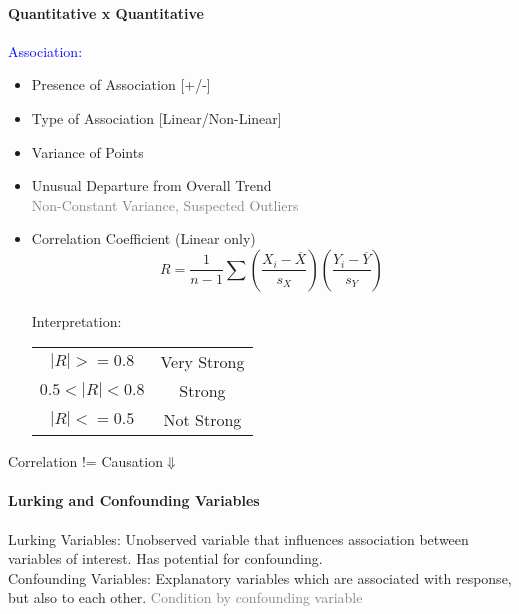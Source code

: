 \paragraph{Quantitative x Quantitative}
\textcolor{Blue}{Association:}
\begin{itemize}
	\item Presence of Association [+/-]
	\item Type of Association [Linear/Non-Linear]
	\item Variance of Points
	\item Unusual Departure from Overall Trend\\
		\textcolor{Gray}{Non-Constant Variance, Suspected Outliers}
	\item Correlation Coefficient (Linear only)
		\[R=\frac{1}{n-1}\sum(\frac{X_i-\overline{X}}{s_X})(\frac{Y_i-\overline{Y}}{s_Y})\]\\
		Interpretation:\\
		\begin{center}
			\begin{tabular}{c c}
				\midrule
				$\left|R\right|>=0.8$ & Very Strong\\
				$0.5<\left|R\right|<0.8$ & Strong\\
				$\left|R\right|<=0.5$ & Not Strong\\
				\midrule
			\end{tabular}
		\end{center}
\end{itemize}
Correlation != Causation$\Downarrow$
\paragraph{Lurking and Confounding Variables}
\textcolor{Bittersweet}{Lurking Variables}: Unobserved variable that influences association between
variables of interest. Has potential for confounding.\\
\textcolor{Bittersweet}{Confounding Variables}: Explanatory variables which are associated with response,
but also to each other. \textcolor{Gray}{Condition by confounding variable}